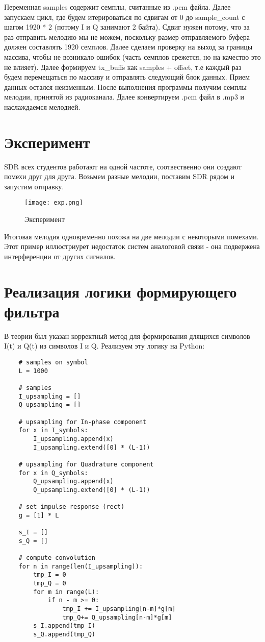 Переменная samples содержит семплы, считанные из .pcm файла. Далее запускаем цикл, где будем итерироваться по сдвигам от 0 до 
sample\_count с шагом 1920 * 2 (потому I и Q занимают 2 байта). Сдвиг нужен потому, что за раз отправить мелодию мы не можем,
поскольку размер отправляемого буфера должен составлять 1920 семплов. Далее сделаем проверку на выход за границы массива, чтобы не возникало
ошибок (часть семплов срежется, но на качество это не влияет). Далее формируем tx\_buffs как samples + offset, т.е каждый раз
будем перемещаться по массиву и отправлять следующий блок данных. Прием данных остался неизменным. После выполнения программы
получим семплы мелодии, принятой из радиоканала. Далее конвертируем .pcm файл в .mp3 и наслаждаемся мелодией.

\section*{\textbf{Эксперимент}}

SDR всех студентов работают на одной частоте, соотвественно они создают помехи друг для друга. Возьмем разные мелодии, поставим
SDR рядом и запустим отправку. 

\begin{figure}[H]
    \centering
    \texttt{[image: exp.png]}
    \caption{Эксперимент}
\end{figure}

Итоговая мелодия одновременно похожа на две мелодии с некоторыми помехами. Этот пример иллюстриурет недостаток систем
аналоговой связи - она подвержена интерференции от других сигналов.

\section*{\textbf{Реализация логики формирующего фильтра}}

В теории был указан корректный метод для формирования длящихся символов I(t) и Q(t) из символов I и Q. Реализуем эту логику на
Python:

\begin{lstlisting}
    # samples on symbol
    L = 1000

    # samples
    I_upsampling = []
    Q_upsampling = []

    # upsampling for In-phase component
    for x in I_symbols:
        I_upsampling.append(x)
        I_upsampling.extend([0] * (L-1))

    # upsampling for Quadrature component
    for x in Q_symbols:
        Q_upsampling.append(x)
        Q_upsampling.extend([0] * (L-1))
    
    # set impulse response (rect)
    g = [1] * L

    s_I = []
    s_Q = []

    # compute convolution
    for n in range(len(I_upsampling)):
        tmp_I = 0
        tmp_Q = 0
        for m in range(L):
            if n - m >= 0:
                tmp_I += I_upsampling[n-m]*g[m]
                tmp_Q+= Q_upsampling[n-m]*g[m]
        s_I.append(tmp_I)
        s_Q.append(tmp_Q)

\end{lstlisting}

